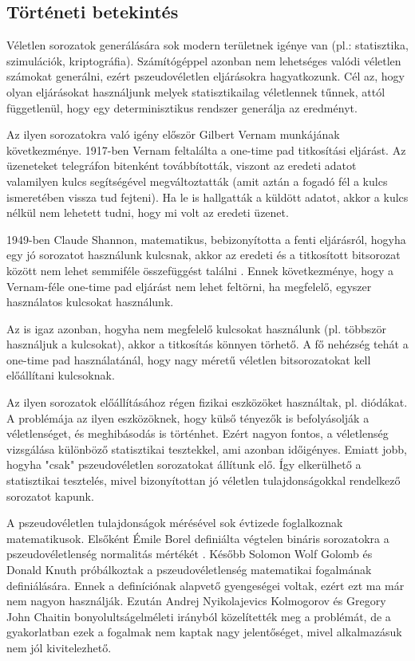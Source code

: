 \documentclass[12pt]{article}
\begin{document}
	\subsection{Történeti betekintés}
	Véletlen sorozatok generálására sok modern területnek igénye van (pl.: statisztika, szimulációk, kriptográfia). Számítógéppel azonban nem lehetséges valódi véletlen számokat generálni, ezért pszeudovéletlen eljárásokra hagyatkozunk. Cél az, hogy olyan eljárásokat használjunk melyek statisztikailag véletlennek tűnnek, attól függetlenül, hogy egy determinisztikus rendszer generálja az eredményt.
	\par
	Az ilyen sorozatokra való igény először Gilbert Vernam munkájának következménye. 1917-ben Vernam feltalálta a one-time pad titkosítási eljárást. Az üzeneteket telegráfon bitenként továbbították, viszont az eredeti adatot valamilyen kulcs segítségével megváltoztatták (amit aztán a fogadó fél a kulcs ismeretében vissza tud fejteni). Ha le is hallgatták a küldött adatot, akkor a kulcs nélkül nem lehetett tudni, hogy mi volt az eredeti üzenet.
	\par
	1949-ben Claude Shannon, matematikus, bebizonyította a fenti eljárásról, hogyha egy jó sorozatot használunk kulcsnak, akkor az eredeti és a titkosított bitsorozat között nem lehet semmiféle összefüggést találni \cite{shannon}. Ennek következménye, hogy a Vernam-féle one-time pad eljárást nem lehet feltörni, ha megfelelő, egyszer használatos kulcsokat használunk.
	\par
	Az is igaz azonban, hogyha nem megfelelő kulcsokat használunk (pl. többször használjuk a kulcsokat), akkor a titkosítás könnyen törhető. A fő nehézség tehát a one-time pad használatánál, hogy nagy méretű véletlen bitsorozatokat kell előállítani kulcsoknak.
	\par
	Az ilyen sorozatok előállításához régen fizikai eszközöket használtak, pl. diódákat. A problémája az ilyen eszközöknek, hogy külső tényezők is befolyásolják a véletlenséget, és meghibásodás is történhet. Ezért nagyon fontos, a véletlenség vizsgálása különböző statisztikai tesztekkel, ami azonban időigényes. Emiatt jobb, hogyha "csak" pszeudovéletlen sorozatokat állítunk elő. Így elkerülhető a statisztikai tesztelés, mivel bizonyítottan jó véletlen tulajdonságokkal rendelkező sorozatot kapunk.
	\par
	A pszeudovéletlen tulajdonságok mérésével sok évtizede foglalkoznak matematikusok. Elsőként Émile Borel definiálta végtelen bináris sorozatokra a pszeudovéletlenség normalitás mértékét \cite{borel}. Később Solomon Wolf Golomb és Donald Knuth \cite{knuth} próbálkoztak a pszeudovéletlenség matematikai fogalmának definiálására. Ennek a definíciónak alapvető gyengeségei voltak, ezért ezt ma már nem nagyon használják. Ezután Andrej Nyikolajevics Kolmogorov \cite{kolmogorov} és Gregory John Chaitin bonyolultságelméleti irányból közelítették meg a problémát, de a gyakorlatban ezek a fogalmak nem kaptak nagy jelentőséget, mivel alkalmazásuk nem jól kivitelezhető.
\end{document}
